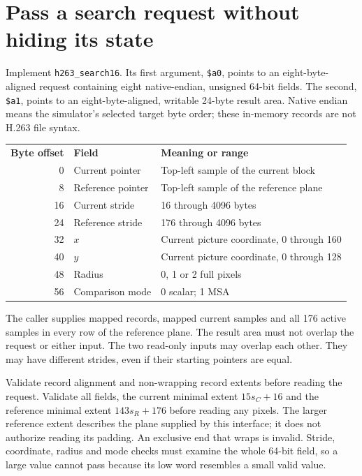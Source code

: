 \section{Pass a search request without hiding its state}
Implement \texttt{h263\_search16}. Its first argument, \texttt{\$a0}, points to
an eight-byte-aligned request containing eight native-endian, unsigned 64-bit
fields. The second, \texttt{\$a1}, points to an eight-byte-aligned, writable
24-byte result area. Native endian means the simulator's selected target byte
order; these in-memory records are not H.263 file syntax.
\begin{center}
  \begin{tabular}{rll}
    \textbf{Byte offset} & \textbf{Field}    & \textbf{Meaning or range}                 \\
    0                    & Current pointer   & Top-left sample of the current block      \\
    8                    & Reference pointer & Top-left sample of the reference plane    \\
    16                   & Current stride    & 16 through 4096 bytes                     \\
    24                   & Reference stride  & 176 through 4096 bytes                    \\
    32                   & $x$               & Current picture coordinate, 0 through 160 \\
    40                   & $y$               & Current picture coordinate, 0 through 128 \\
    48                   & Radius            & 0, 1 or 2 full pixels                     \\
    56                   & Comparison mode   & 0 scalar; 1 MSA
  \end{tabular}
\end{center}
The caller supplies mapped records, mapped current samples and all 176 active
samples in every row of the reference plane. The result area must not overlap
the request or either input. The two read-only inputs may overlap each other.
They may have different strides, even if their starting pointers are equal.

Validate record alignment and non-wrapping record extents before reading the
request. Validate all fields, the current minimal extent $15s_C+16$ and the
reference minimal extent $143s_R+176$ before reading any pixels. The larger
reference extent describes the plane supplied by this interface; it does not
authorize reading its padding. An exclusive end that wraps is invalid. Stride,
coordinate, radius and mode checks must examine the whole 64-bit field, so a
large value cannot pass because its low word resembles a small valid value.

